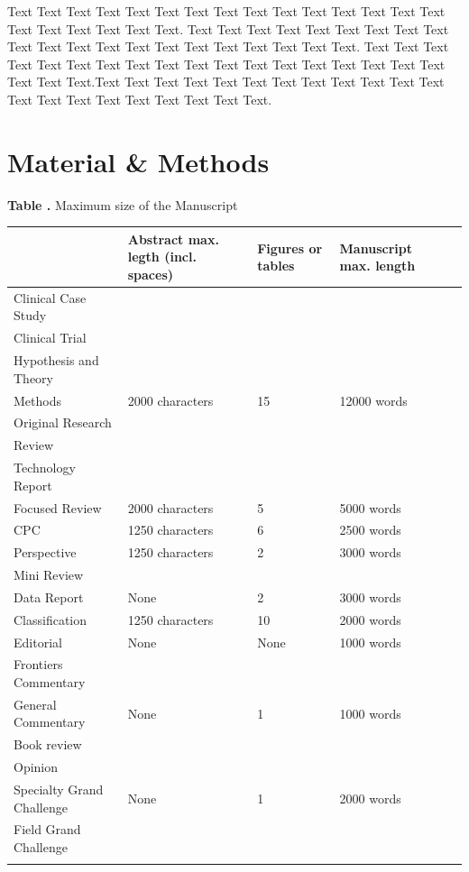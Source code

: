 \documentclass{frontiersSCNS} %
\begin{document}
%
%
Text Text Text Text Text Text  Text Text Text Text Text Text Text Text Text  Text Text Text Text Text Text. Text Text Text Text Text Text  Text Text Text Text Text Text Text Text Text  Text Text Text Text Text Text. Text Text Text Text Text Text  Text Text Text Text Text Text Text Text Text  Text Text Text Text Text Text.Text Text Text Text Text Text  Text Text Text Text Text Text Text Text Text  Text Text Text Text Text Text.

\section{Material \& Methods}


\begin{table}[!t]
\textbf{\label{Tab:01} Table .}{ Maximum size of the Manuscript }

\processtable{ }
{\begin{tabular}{lllll}\toprule
 & Abstract max. legth (incl. spaces) & Figures or tables & Manuscript max. length \\\midrule
Clinical Case Study & & & &\\
Clinical Trial & & & &\\
Hypothesis and Theory & & & &\\
Methods & 2000 characters  & 15 & 12000 words \\
Original Research & & & &\\
Review & & & &\\
Technology Report & & & &\\\midrule
Focused Review & 2000 characters & 5 & 5000 words \\\midrule
CPC &  1250 characters& 6 & 2500 words  \\\midrule
Perspective & 1250 characters & 2 & 3000 words  \\
Mini Review & & & &\\\midrule
Data Report & None & 2 & 3000 words\\\midrule
Classification & 1250 characters & 10 & 2000 words \\\midrule
Editorial & None & None & 1000 words  \\\midrule
Frontiers Commentary  & & &\\
General Commentary & None & 1 & 1000 words\\
Book review & & & \\\midrule
Opinion   & & &\\
Specialty Grand Challenge & None & 1 & 2000 words\\
Field Grand Challenge & & & &\\\botrule
\end{tabular}}{}
\end{table}
\end{document}
